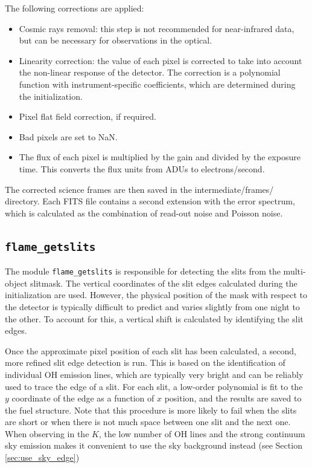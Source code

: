 \documentclass[a4paper, notitlepage]{article}
\begin{document}
The following corrections are applied:
\begin{itemize}
\item Cosmic rays removal: this step is not recommended for near-infrared data, but can be necessary for observations in the optical.
\item Linearity correction: the value of each pixel is corrected to take into account the non-linear response of the detector. The correction is a polynomial function with instrument-specific coefficients, which are determined during the initialization.
\item Pixel flat field correction, if required.
\item Bad pixels are set to NaN.
\item The flux of each pixel is multiplied by the gain and divided by the exposure time. This converts the flux units from ADUs to electrons/second.
\end{itemize}

The corrected science frames are then saved in the intermediate/frames/ directory. Each FITS file contains a second extension with the error spectrum, which is calculated as the combination of read-out noise and Poisson noise.


\subsection{\texttt{flame\_getslits}}
\label{sec:getslits}

The module \texttt{flame\_getslits} is responsible for detecting the slits from the multi-object slitmask. The vertical coordinates of the slit edges calculated during the initialization are used. However, the physical position of the mask with respect to the detector is typically difficult to predict and varies slightly from one night to the other. To account for this, a vertical shift is calculated by identifying the slit edges.

Once the approximate pixel position of each slit has been calculated, a second, more refined slit edge detection is run. This is based on the identification of individual OH emission lines, which are typically very bright and can be reliably used to trace the edge of a slit. For each slit, a low-order polynomial is fit to the $y$ coordinate of the edge as a function of $x$ position, and the results are saved to the fuel structure. Note that this procedure is more likely to fail when the slits are short or when there is not much space between one slit and the next one. When observing in the $K$, the low number of OH lines and the strong continuum sky emission makes it convenient to use the sky background instead (see Section \ref{sec:use_sky_edge})
\end{document}
